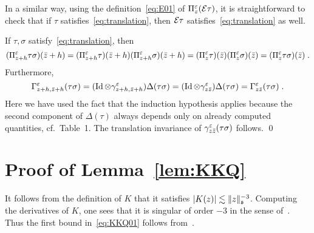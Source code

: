 \documentclass[reqno,11pt]{article}
\DeclareMathOperator{\Id}{Id}
\def\fraks{\mathfrak{s}}
\begin{document}
\begin{enum}
\item 	In a similar way, using the definition~\eqref{eq:E01} of
$\Pi^\varepsilon_z({\mathcal E}\tau)$, it is straightforward to check that if $\tau$
satisfies~\eqref{eq:translation}, then ${\mathcal E}\tau$
satisfies~\eqref{eq:translation} as well. 

\item 	If $\tau,\sigma$ satisfy~\eqref{eq:translation}, then 
\[
 (\Pi^\varepsilon_{z+h}\tau\sigma)(\bar z+h) 
 = (\Pi^\varepsilon_{z+h}\tau)(\bar z+h)(\Pi^\varepsilon_{z+h}\sigma)(\bar z+h)
 = (\Pi^\varepsilon_z\tau)(\bar z)(\Pi^\varepsilon_z\sigma)(\bar z)
 = (\Pi^\varepsilon_z\tau\sigma)(\bar z)\;.
\]
Furthermore, 
\[
 \Gamma^\eps_{z+h,\bar z+h}(\tau\sigma) 
 = (\Id\otimes\gamma^\eps_{z+h,\bar z+h})\Delta(\tau\sigma)
 = (\Id\otimes\gamma^\eps_{z\bar z})\Delta(\tau\sigma)
 = \Gamma^\eps_{z\bar z}(\tau\sigma)\;.
\]
Here we have used the fact that the induction hypothesis applies because
the second component of $\Delta(\tau)$ always depends only on already computed
quantities, cf.~Table~1. The translation invariance of $\gamma^\varepsilon_{z\bar
z}(\tau\sigma)$ follows. 
\qed
\end{enum}



\section{Proof of Lemma~\ref{lem:KKQ}}
\label{app_proof_KKQ}

It follows from the definition of $K$ that it satisfies $\abs{K(z)}\lesssim
\norm{z}_{\fraks}^{-3}$. Computing the derivatives of $K$, one sees that
it is singular of order $-3$ in the sense of~\cite[Def.~10.12]{Hairer2014}.
Thus the first bound in~\eqref{eq:KKQ01} follows
from~\cite[Lemma~10.17]{Hairer2014}. 
\end{document}
